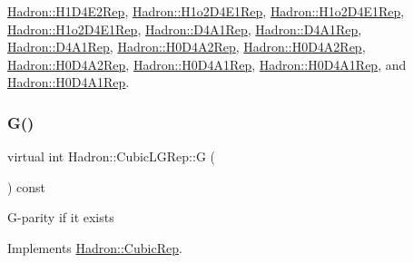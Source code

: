 \mbox{\hyperlink{structHadron_1_1H1D4E2Rep_a89812641dc6e1a2786c442f6bc8775d7}{Hadron\+::\+H1\+D4\+E2\+Rep}}, \mbox{\hyperlink{structHadron_1_1H1o2D4E1Rep_a89d088da502c7cd8faeecc24caebcc97}{Hadron\+::\+H1o2\+D4\+E1\+Rep}}, \mbox{\hyperlink{structHadron_1_1H1o2D4E1Rep_a89d088da502c7cd8faeecc24caebcc97}{Hadron\+::\+H1o2\+D4\+E1\+Rep}}, \mbox{\hyperlink{structHadron_1_1H1o2D4E1Rep_a89d088da502c7cd8faeecc24caebcc97}{Hadron\+::\+H1o2\+D4\+E1\+Rep}}, \mbox{\hyperlink{structHadron_1_1D4A1Rep_a4224f0d47cc0a894a9da4c8505d51c29}{Hadron\+::\+D4\+A1\+Rep}}, \mbox{\hyperlink{structHadron_1_1D4A1Rep_a4224f0d47cc0a894a9da4c8505d51c29}{Hadron\+::\+D4\+A1\+Rep}}, \mbox{\hyperlink{structHadron_1_1D4A1Rep_a4224f0d47cc0a894a9da4c8505d51c29}{Hadron\+::\+D4\+A1\+Rep}}, \mbox{\hyperlink{structHadron_1_1H0D4A2Rep_a637522dc6caee2869b2bb632a4c5a5b5}{Hadron\+::\+H0\+D4\+A2\+Rep}}, \mbox{\hyperlink{structHadron_1_1H0D4A2Rep_a637522dc6caee2869b2bb632a4c5a5b5}{Hadron\+::\+H0\+D4\+A2\+Rep}}, \mbox{\hyperlink{structHadron_1_1H0D4A2Rep_a637522dc6caee2869b2bb632a4c5a5b5}{Hadron\+::\+H0\+D4\+A2\+Rep}}, \mbox{\hyperlink{structHadron_1_1H0D4A1Rep_ab13ff026da1bc59df4b52835038296d5}{Hadron\+::\+H0\+D4\+A1\+Rep}}, \mbox{\hyperlink{structHadron_1_1H0D4A1Rep_ab13ff026da1bc59df4b52835038296d5}{Hadron\+::\+H0\+D4\+A1\+Rep}}, and \mbox{\hyperlink{structHadron_1_1H0D4A1Rep_ab13ff026da1bc59df4b52835038296d5}{Hadron\+::\+H0\+D4\+A1\+Rep}}.

\mbox{\label{structHadron_1_1CubicLGRep_ace26f7b2d55e3a668a14cb9026da5231}} 
\subsubsection{\texorpdfstring{G()}{G()}\hspace{0.1cm}{\footnotesize\ttfamily [2/3]}}
{\footnotesize\ttfamily virtual int Hadron\+::\+Cubic\+L\+G\+Rep\+::G (\begin{DoxyParamCaption}{ }\end{DoxyParamCaption}) const\hspace{0.3cm}{\ttfamily [pure virtual]}}

G-\/parity if it exists 

Implements \mbox{\hyperlink{structHadron_1_1CubicRep_a52104e43266d1614c00bbd1c3b395458}{Hadron\+::\+Cubic\+Rep}}.



